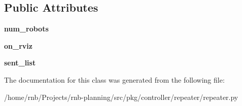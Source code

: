 \subsection*{Public Attributes}
\begin{DoxyCompactItemize}
\item 
\mbox{\label{classrnb-planning_1_1src_1_1pkg_1_1controller_1_1repeater_1_1repeater_1_1_multi_tracker_a25011e6528d6eb3832d868b8e2095ee2}} 
{\bfseries num\+\_\+robots}
\item 
\mbox{\label{classrnb-planning_1_1src_1_1pkg_1_1controller_1_1repeater_1_1repeater_1_1_multi_tracker_a7b4e3f063acf88e48ce2a84bc98a0e82}} 
{\bfseries on\+\_\+rviz}
\item 
\mbox{\label{classrnb-planning_1_1src_1_1pkg_1_1controller_1_1repeater_1_1repeater_1_1_multi_tracker_a576f7da01415f45c3e86e163d7a731e6}} 
{\bfseries sent\+\_\+list}
\end{DoxyCompactItemize}


The documentation for this class was generated from the following file\+:\begin{DoxyCompactItemize}
\item 
/home/rnb/\+Projects/rnb-\/planning/src/pkg/controller/repeater/repeater.\+py\end{DoxyCompactItemize}
